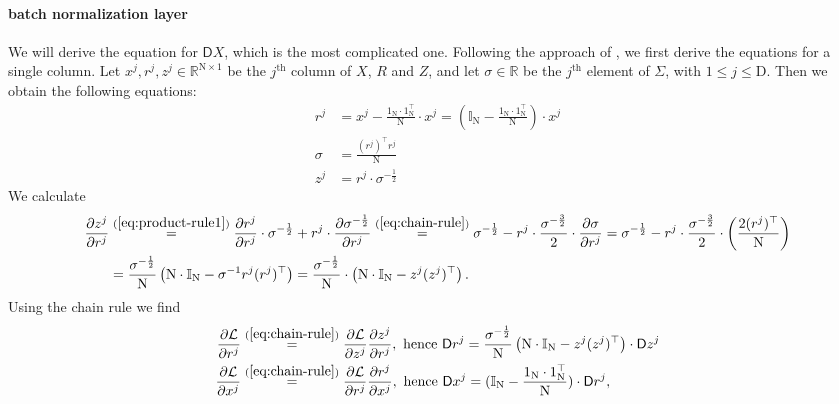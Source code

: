 \documentclass[twoside,11pt]{article}
\newcommand{\const}[1]{\ensuremath{\mathrm{#1}}} %
\newcommand{\Gradient}{\textsf{D}}
\newcommand{\Derivative}[2]{\ensuremath{\frac{\partial #1}{\partial #2}}}
\newcommand{\Reals}{\mathbb{R}}
\begin{document}
\paragraph{batch normalization layer}
We will derive the equation for $\Gradient X$, which is the most complicated one.
Following the approach of \citep{yeh-batch-norm}, we first derive the equations for a single column. Let $x^j, r^j, z^j \in \Reals^{\const{N} \times 1}$ be the $j^\text{th}$ column of $X$, $R$ and $Z$, and let $\sigma \in \Reals$ be the $j^\text{th}$ element of $\Sigma$, with $1 \leq j \leq \const{D}$. Then we obtain the following equations:
\begin{align}
r^j &= x^j - \frac{1_\const{N} \cdot 1_\const{N}^\top}{\const{N}} \cdot x^j = (\mathbb{I}_{\const{N}} - \frac{1_\const{N} \cdot 1_\const{N}^\top}{\const{N}}) \cdot x^j
\\
\sigma &= \frac{(r^j)^\top r^j}{\const{N}} 
\\
z^j &= r^j \cdot \sigma^{-\frac{1}{2}}
\end{align}
We calculate
\begin{align}
  \Derivative{z^j}{r^j}
  & \overset{(\ref{eq:product-rule1})}{=}
  \Derivative{r^j}{r^j} \cdot \sigma^{-\frac{1}{2}}
  + r^j \cdot \Derivative{\sigma^{-\frac{1}{2}}}{r^j}
  \overset{(\ref{eq:chain-rule})}{=} 
  \sigma^{-\frac{1}{2}} - r^j \cdot 
  \frac{\sigma^{-\frac{3}{2}}}{2} \cdot \Derivative{\sigma}{r^j}
  =
  \sigma^{-\frac{1}{2}} - r^j \cdot 
  \frac{\sigma^{-\frac{3}{2}}}{2} \cdot \left( \frac{2 (r^j)^\top}{\const{N}} \right)
  \\
  &= 
  \frac{\sigma^{-\frac{1}{2}}}{\const{N}}
  \left(
    \const{N} \cdot \mathbb{I}_\const{N} - \sigma^{-1} r^j (r^j)^\top
  \right)
  =
  \frac{\sigma^{-\frac{1}{2}}}{\const{N}}
  \cdot 
  \left( 
    \const{N} \cdot \mathbb{I}_{\const{N}} - z^j (z^j)^\top  
  \right).
\end{align}
Using the chain rule we find
\begin{align}
  \frac{\partial \mathcal{L}}{\partial r^j} 
  & \overset{(\ref{eq:chain-rule})}{=}
  \frac{\partial \mathcal{L}}{\partial z^j}
  \frac{\partial z^j}{\partial r^j},
  \text{ hence }
  \Gradient{r^j} = 
  \frac{\sigma^{-\frac{1}{2}}}{\const{N}}
  \left( 
    \const{N} \cdot \mathbb{I}_{\const{N}} - z^j (z^j)^\top  
  \right)
  \cdot
  \Gradient{z^j}
  \\
  \frac{\partial \mathcal{L}}{\partial x^j} 
  & \overset{(\ref{eq:chain-rule})}{=}
  \frac{\partial \mathcal{L}}{\partial r^j}
  \frac{\partial r^j}{\partial x^j},
  \text{ hence }
  \Gradient x^j 
  = 
  (\mathbb{I}_{\const{N}} - \frac{1_\const{N} \cdot 1_\const{N}^\top}{\const{N}})
  \cdot
  \Gradient r^j,
\end{align}
\end{document}
